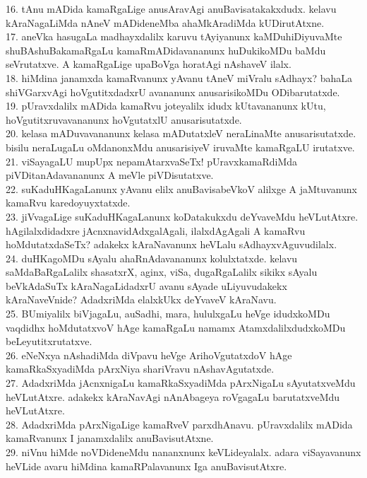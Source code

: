 \documentclass{article}
\begin{document}
16. tAnu mADida kamaRgaLige anusAravAgi anuBavisatakakxdudx. kelavu kAraNagaLiMda nAneV mADideneMba ahaMkAradiMda kUDirutAtxne.\\
17. aneVka hasugaLa madhayxdalilx karuvu tAyiyanunx kaMDuhiDiyuvaMte shuBAshuBakamaRgaLu kamaRmADidavananunx huDukikoMDu baMdu seVrutatxve. A kamaRgaLige upaBoVga horatAgi nAshaveV ilalx.\\
18. hiMdina janamxda kamaRvanunx yAvanu tAneV miVralu sAdhayx? bahaLa shiVGarxvAgi hoVgutitxdadxrU avananunx anusarisikoMDu ODibarutatxde.\\
19. pUravxdalilx mADida kamaRvu joteyalilx idudx kUtavananunx kUtu, hoVgutitxruvavananunx hoVgutatxlU anusarisutatxde.\\
20. kelasa mADuvavananunx kelasa mADutatxleV neraLinaMte anusarisutatxde. bisilu neraLugaLu oMdanonxMdu anusarisiyeV iruvaMte kamaRgaLU irutatxve.\\
21. viSayagaLU mupUpx nepamAtarxvaSeTx! pUravxkamaRdiMda piVDitanAdavananunx A meVle piVDisutatxve.\\
22. suKaduHKagaLanunx yAvanu elilx anuBavisabeVkoV alilxge A jaMtuvanunx kamaRvu karedoyuyxtatxde.\\
23. jiVvagaLige suKaduHKagaLanunx koDatakukxdu deYvaveMdu heVLutAtxre. hAgilalxdidadxre jAcnxnavidAdxgalAgali, ilalxdAgAgali A kamaRvu hoMdutatxdaSeTx? adakekx kAraNavanunx heVLalu sAdhayxvAguvudilalx.\\
24. duHKagoMDu sAyalu ahaRnAdavananunx kolulxtatxde. kelavu saMdaBaRgaLalilx shasatxrX, aginx, viSa, dugaRgaLalilx sikikx sAyalu beVkAdaSuTx kAraNagaLidadxrU avanu sAyade uLiyuvudakekx kAraNaveVnide? AdadxriMda elalxkUkx deYvaveV kAraNavu.\\
25. BUmiyalilx biVjagaLu, auSadhi, mara, hululxgaLu heVge idudxkoMDu vaqdidhx hoMdutatxvoV hAge kamaRgaLu namamx AtamxdalilxdudxkoMDu beLeyutitxrutatxve.\\
26. eNeNxya nAshadiMda diVpavu heVge ArihoVgutatxdoV hAge kamaRkaSxyadiMda pArxNiya shariVravu nAshavAgutatxde.\\
27. AdadxriMda jAcnxnigaLu kamaRkaSxyadiMda pArxNigaLu sAyutatxveMdu heVLutAtxre. adakekx kAraNavAgi nAnAbageya roVgagaLu barutatxveMdu heVLutAtxre.\\
28. AdadxriMda pArxNigaLige kamaRveV parxdhAnavu. pUravxdalilx mADida kamaRvanunx I janamxdalilx anuBavisutAtxne.\\
29. niVnu hiMde noVDideneMdu nananxnunx keVLideyalalx. adara viSayavanunx heVLide avaru hiMdina kamaRPalavanunx Iga anuBavisutAtxre.\\
\end{document}

